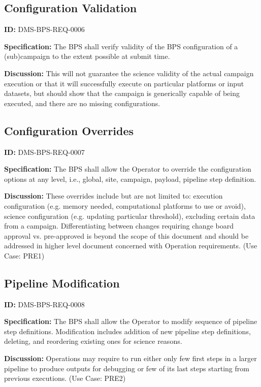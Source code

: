 \documentclass[SE,toc]{lsstdoc}
\begin{document}
\subsection{Configuration Validation}

\label{DMS-BPS-REQ-0006}
\textbf{ID:} DMS-BPS-REQ-0006

\textbf{Specification:}
The BPS shall verify validity of the BPS configuration of a (sub)campaign to the extent possible at submit time.

\textbf{Discussion:}
This will not guarantee the science validity of the actual campaign execution or that it will successfully execute on particular platforms or input datasets, but should show that the campaign is generically capable of being executed, and there are no missing configurations.

\subsection{Configuration Overrides}

\label{DMS-BPS-REQ-0007}
\textbf{ID:} DMS-BPS-REQ-0007

\textbf{Specification:}
The BPS shall allow the Operator to override the configuration options at any level, i.e., global, site, campaign, payload, pipeline step definition.

\textbf{Discussion:}
These overrides include but are not limited to: execution configuration (e.g. memory needed, computational platforms to use or avoid), science configuration (e.g. updating particular threshold), excluding certain data from a campaign. Differentiating between changes requiring change board approval vs. pre-approved is beyond the scope of this document and should be addressed in higher level document concerned with Operation requirements. (Use Case: PRE1)

\subsection{Pipeline Modification}

\label{DMS-BPS-REQ-0008}
\textbf{ID:} DMS-BPS-REQ-0008

\textbf{Specification:}
The BPS shall allow the Operator to modify sequence of pipeline step definitions.  Modification includes addition of new pipeline step definitions, deleting, and reordering existing ones for science reasons.

\textbf{Discussion:}
Operations may require to run either only few first steps in a larger pipeline to produce outputs for debugging or few of its last steps starting from previous executions. (Use Case: PRE2)
\end{document}
